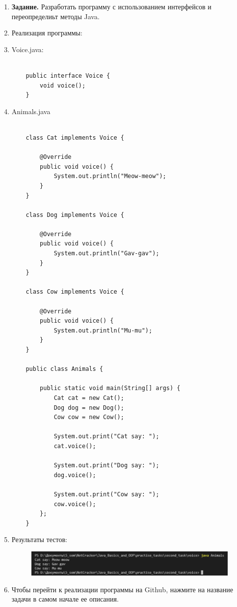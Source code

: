 \documentclass[a4paper]{article}
\begin{document}
\begin{enumerate}
    \item \textbf{Задание.} Разработать программу с использованием интерфейсов и переопределиьт методы Java.
    \item Реализация программы:
    \item Voice.java:
    \begin{lstlisting}
        
    public interface Voice {
        void voice();
    }

    \end{lstlisting}

    \item Animals.java
    \begin{lstlisting}
        
    class Cat implements Voice {

        @Override
        public void voice() {
            System.out.println("Meow-meow");
        }
    }

    class Dog implements Voice {

        @Override
        public void voice() {
            System.out.println("Gav-gav");
        }
    }

    class Cow implements Voice {

        @Override
        public void voice() {
            System.out.println("Mu-mu");
        }
    }

    public class Animals {

        public static void main(String[] args) {
            Cat cat = new Cat();
            Dog dog = new Dog();
            Cow cow = new Cow();

            System.out.print("Cat say: "); 
            cat.voice();

            System.out.print("Dog say: ");
            dog.voice();

            System.out.print("Cow say: ");
            cow.voice();
        };
    }
    \end{lstlisting}

    \item Результаты тестов:
        
        \begin{figure}[h!]
            \begin{center}
                \includegraphics[scale = 0.6]{test_t1.png}
                \label{p2} %
            \end{center}
        \end{figure}
    
    \item Чтобы перейти к реализации программы на Github, нажмите на название задачи в самом начале ее описания.
    
\end{enumerate}
\end{document}
